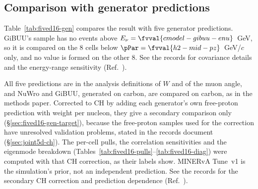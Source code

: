 \subsection{Comparison with generator predictions}
\label{sec:fived16-gen}
Table~\ref{tab:fived16-gen} compares the result with five generator predictions. GiBUU's sample has no events above $E_\nu=\fvval{cmodel-gibuu-enu}$~GeV, so it is compared on the 8 cells below $\pPar=\fvval{h2-mid-pz}$~GeV/$c$ only, and no value is formed on the other 8. See the records for covariance details and the energy-range sensitivity (Ref.~\cite{NoteRecords2026}).

All five predictions are in the analysis definitions of $W$ and of the muon angle, and NuWro and GiBUU, generated on carbon, are compared on carbon, as in the methods paper. Corrected to CH by adding each generator's own free-proton prediction with weight  per nucleon, they give a secondary comparison only (\S\ref{sec:fived16-gen-target}), because the free-proton samples used for the correction have unresolved validation problems, stated in the records document (\S\ref{sec:joint5d-ch}). The per-cell pulls, the correlation sensitivities and the eigenmode breakdown (Tables~\ref{tab:fived16-pulls}--\ref{tab:fived16-diag}) were computed with that CH correction, as their labels show. MINERvA Tune~v1 is the simulation's prior, not an independent prediction. See the records for the secondary CH correction and prediction dependence (Ref.~\cite{NoteRecords2026}).

